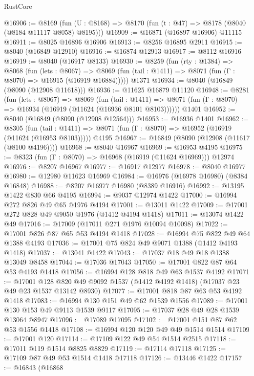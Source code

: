 \begin{lexlean}{RustCore}
\begin{coremodule}
@16906 := @8169
    (fun (U : @8168) => @8170 (fun (t : @47) => @8178 (@8040 (@8184 @11117 @8058) @8195)))
@16909 := @16871 (@16897 @16906) @11115
@16911 := @8025 @16896 @16906
@16913 := @8256 @16895 @2911
@16915 := @8040 (@16849 @12910)
@16916 := @16874 @12913
@16917 := @8112 @16916
@16919 := @8040 (@16917 @8133)
@16930 := @8259
    (fun (rty : @1384) =>
    @8068
      (fun (lets : @8067) =>
      @8069 (fun (tail : @1411) => @8071 (fun (Γ : @8070) => @16915 (@16919 @16884)))))
    @1371
@16934 := @8040 (@16849 (@8090 (@12908 @11618)))
@16936 := @11625 @16879 @11120
@16948 := @8281
    (fun (lets : @8067) =>
    @8069
      (fun (tail : @1411) =>
      @8071 (fun (Γ : @8070) => @16934 (@16919 (@11624 (@16936 @8101 @8103))))))
    @1401
@16952 := @8040 (@16849 (@8090 (@12908 @12564)))
@16953 := @16936 @1401
@16962 := @8305
    (fun (tail : @1411) => @8071 (fun (Γ : @8070) => @16952 (@16919 (@11624 (@16953 @8103)))))
    @4195
@16967 := @16849 (@8090 (@12908 (@11617 (@8100 @4196))))
@16968 := @8040 @16967
@16969 := @16953 @4195
@16975 := @8323 (fun (Γ : @8070) => @16968 (@16919 (@11624 @16969))) @12974
@16976 := @8207 @16967
@16977 := @16917 @12977
@16978 := @8040 @16977
@16980 := @12980 @11623 @16969
@16984 := @16976 (@16978 @16980) (@8384 @16848)
@16988 := @8207 @16977 @16980 (@8389 @16916)
@16992 := @13195 @1422 @830 @66 @4195
@16994 := @9037 @12974 @1422
@17000 := @16994 @272 @826 @49 @65 @1976 @4194
@17001 := @13011 @1422
@17009 := @17001 @272 @828 @49 @9050 @1976 (@1412 @4194 @1418)
@17011 := @13074 @1422 @49
@17016 := @17009 (@17011 @271 @1976 @10094 @10098)
@17022 := @17001 @826 @87 @65 @53 @4194 @1418
@17028 := @16994 @75 @822 @49 @64 @1388 @4193
@17036 := @17001 @75 @824 @49 @9071 @1388 (@1412 @4193 @1418)
@17037 := @13041 @1422
@17043 := @17037 @18 @49 @18 @1388 @13049 @8458
@17044 := @17036 @17043
@17050 := @17001 @822 @87 @64 @53 @4193 @1418
@17056 := @16994 @128 @818 @49 @63 @1537 @4192
@17071 := @17001
    @128
    @820
    @49
    @9092
    @1537
    (@1412 @4192 @1418)
    (@17037 @23 @49 @23 @1537 @13142 @8930)
@17077 := @17001 @818 @87 @63 @53 @4192 @1418
@17083 := @16994 @130 @151 @49 @62 @1539 @1556
@17089 := @17001 @130 @153 @49 @9113 @1539 @9117
@17095 := @17037 @28 @49 @28 @1539 @13064 @8947
@17096 := @17089 @17095
@17102 := @17001 @151 @87 @62 @53 @1556 @1418
@17108 := @16994 @120 @120 @49 @49 @1514 @1514
@17109 := @17001 @120
@17114 := @17109 @122 @49 @54 @1514 @2515
@17118 := @17011 @119 @1514 @8825 @8829
@17119 := @17114 @17118
@17125 := @17109 @87 @49 @53 @1514 @1418 @17118
@17126 := @13446 @1422
@17157 := @16843
    (@16868

\end{coremodule}
\end{lexlean}

